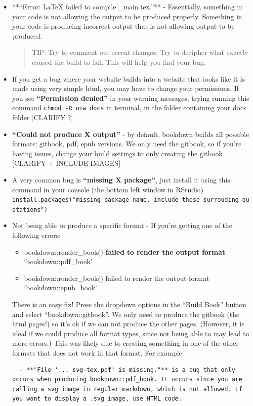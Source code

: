 \documentclass[
]{book}
\providecommand{\tightlist}{%
  \setlength{\itemsep}{0pt}\setlength{\parskip}{0pt}}
\theoremstyle{definition}
\theoremstyle{definition}
\theoremstyle{definition}
\theoremstyle{definition}
\theoremstyle{remark}
\begin{document}
\begin{itemize}
\item
  **``Error: LaTeX failed to compile \_main.tex.''** - Essentially, something in your code is not allowing the output to be produced properly. Something in your code is producing incorrect output that is not allowing output to be produced.

  \begin{quote}
  TIP: Try to comment out recent changes. Try to decipher what exactly caused the build to fail. This will help you find your bug.
  \end{quote}
\item
  If you get a bug where your website builds into a website that looks like it is made using very simple html, you may have to change your permissions. If you see \textbf{``Permission denied''} in your warning messages, trying running this command \texttt{chmod\ -R\ u+w\ docs} in terminal, in the folder containing your docs folder {[}CLARIFY ?{]}
\item
  \textbf{``Could not produce X output''} - by default, bookdown builds all possible formats: gitbook, pdf, epub versions. We only need the gitbook, so if you're having issues, change your build settings to only creating the gitbook {[}CLARIFY + INCLUDE IMAGES{]}
\item
  A very common bug is \textbf{``missing X package''}, just install it using this command in your console (the bottom left window in RStudio) \texttt{install.packages("missing\ package\ name,\ include\ these\ surrouding\ quotations")}
\item
  Not being able to produce a specific format - If you're getting one of the following errors:

  \begin{itemize}
  \tightlist
  \item
    bookdown::render\_book() \textbf{failed to render the output format} `bookdown::pdf\_book'
  \item
    bookdown::render\_book() failed to render the output format `bookdown::epub\_book'
  \end{itemize}

  There is an easy fix! Press the dropdown options in the ``Build Book'' button and select ``bookdown::gitbook''. We only need to produce the gitbook (the html pages!) so it's ok if we can not produce the other pages. (However, it is ideal if we could produce all format types, since not being able to may lead to more errors.) This was likely due to creating something in one of the other formats that does not work in that format. For example:

\begin{verbatim}
  - **"File '..._svg-tex.pdf' is missing."** is a bug that only occurs when producing bookdown::pdf_book. It occurs since you are calling a svg image in regular markdown, which is not allowed. If you want to display a .svg image, use HTML code. 
\end{verbatim}
\end{itemize}
\end{document}
